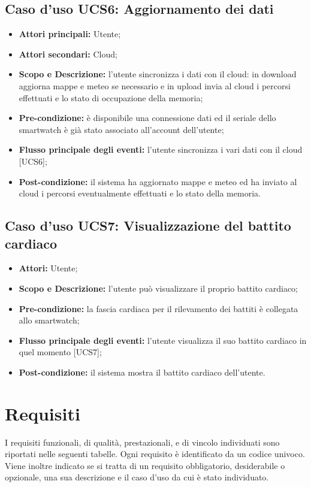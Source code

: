 \subsection{Caso d'uso UCS6: Aggiornamento dei dati}
\begin{itemize}
\item \textbf{Attori principali:} Utente;
\item \textbf{Attori secondari:} Cloud;
\item \textbf{Scopo e Descrizione:} l'utente sincronizza i dati con il cloud: in download aggiorna mappe e meteo se necessario e in upload invia al cloud i percorsi effettuati e lo stato di occupazione della memoria;
\item \textbf{Pre-condizione:} è disponibile una connessione dati ed il seriale dello smartwatch è già stato associato all'account dell'utente;
\item \textbf{Flusso principale degli eventi:} l'utente sincronizza i vari dati con il cloud [UCS6];
\item \textbf{Post-condizione:} il sistema ha aggiornato mappe e meteo ed ha inviato al cloud i percorsi eventualmente effettuati e lo stato della memoria.
\end{itemize}

\subsection{Caso d'uso UCS7: Visualizzazione del battito cardiaco}
\begin{itemize}
\item \textbf{Attori:} Utente;
\item \textbf{Scopo e Descrizione:} l'utente può visualizzare il proprio battito cardiaco;
\item \textbf{Pre-condizione:} la fascia cardiaca per il rilevamento dei battiti è collegata allo smartwatch;
\item \textbf{Flusso principale degli eventi:} l'utente visualizza il suo battito cardiaco in quel momento [UCS7];
\item \textbf{Post-condizione:} il sistema mostra il battito cardiaco dell'utente.
\end{itemize}

\clearpage
\section{Requisiti}
I requisiti funzionali, di qualità, prestazionali, e di vincolo individuati sono riportati nelle seguenti tabelle.
Ogni requisito è identificato da un codice univoco.
Viene inoltre indicato se si tratta di un requisito obbligatorio, desiderabile o opzionale, una sua descrizione e il caso d'uso da cui è stato individuato. 

